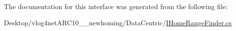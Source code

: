 The documentation for this interface was generated from the following file\-:\begin{DoxyCompactItemize}
\item 
Desktop/vlog4net\-A\-R\-C10\-\_\-\_\-newhoming/\-Data\-Centric/\hyperlink{_i_home_range_finder_8cs}{I\-Home\-Range\-Finder.\-cs}\end{DoxyCompactItemize}

